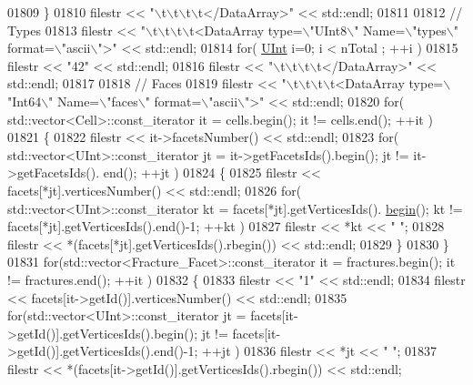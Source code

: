 \begin{DoxyCode}
01809     \}
01810     filestr << \textcolor{stringliteral}{"\(\backslash\)t\(\backslash\)t\(\backslash\)t\(\backslash\)t</DataArray>"} << std::endl;
01811 
01812     \textcolor{comment}{//  Types}
01813     filestr << \textcolor{stringliteral}{"\(\backslash\)t\(\backslash\)t\(\backslash\)t\(\backslash\)t<DataArray type=\(\backslash\)"UInt8\(\backslash\)" Name=\(\backslash\)"types\(\backslash\)" format=\(\backslash\)"ascii\(\backslash\)">"} << std::endl;
01814     \textcolor{keywordflow}{for}( \hyperlink{namespaceFVCode3D_a4bf7e328c75d0fd504050d040ebe9eda}{UInt} i=0; i < nTotal ; ++i )
01815         filestr << \textcolor{stringliteral}{"42"} << std::endl;
01816     filestr << \textcolor{stringliteral}{"\(\backslash\)t\(\backslash\)t\(\backslash\)t\(\backslash\)t</DataArray>"} << std::endl;
01817 
01818     \textcolor{comment}{//  Faces}
01819     filestr << \textcolor{stringliteral}{"\(\backslash\)t\(\backslash\)t\(\backslash\)t\(\backslash\)t<DataArray type=\(\backslash\)"Int64\(\backslash\)" Name=\(\backslash\)"faces\(\backslash\)" format=\(\backslash\)"ascii\(\backslash\)">"} << std::endl;
01820     \textcolor{keywordflow}{for}( std::vector<Cell>::const\_iterator it = cells.begin(); it != cells.end(); ++it )
01821     \{
01822         filestr << it->facetsNumber() << std::endl;
01823         \textcolor{keywordflow}{for}( std::vector<UInt>::const\_iterator jt = it->getFacetsIds().begin(); jt != it->getFacetsIds().
      end(); ++jt )
01824         \{
01825             filestr << facets[*jt].verticesNumber() << std::endl;
01826             \textcolor{keywordflow}{for}( std::vector<UInt>::const\_iterator kt = facets[*jt].getVerticesIds().
      \hyperlink{namespacestd_acec9a198880c12f51f02be95a298a48b}{begin}(); kt != facets[*jt].getVerticesIds().end()-1; ++kt )
01827                 filestr << *kt << \textcolor{stringliteral}{" "};
01828             filestr << *(facets[*jt].getVerticesIds().rbegin()) << std::endl;
01829         \}
01830     \}
01831     \textcolor{keywordflow}{for}(std::vector<Fracture\_Facet>::const\_iterator it = fractures.begin(); it != fractures.end(); ++it )
01832     \{
01833         filestr << \textcolor{stringliteral}{"1"} << std::endl;
01834         filestr << facets[it->getId()].verticesNumber() << std::endl;
01835         \textcolor{keywordflow}{for}(std::vector<UInt>::const\_iterator jt = facets[it->getId()].getVerticesIds().begin(); jt != 
      facets[it->getId()].getVerticesIds().end()-1; ++jt )
01836             filestr << *jt << \textcolor{stringliteral}{" "};
01837         filestr << *(facets[it->getId()].getVerticesIds().rbegin()) << std::endl;

\end{DoxyCode}
